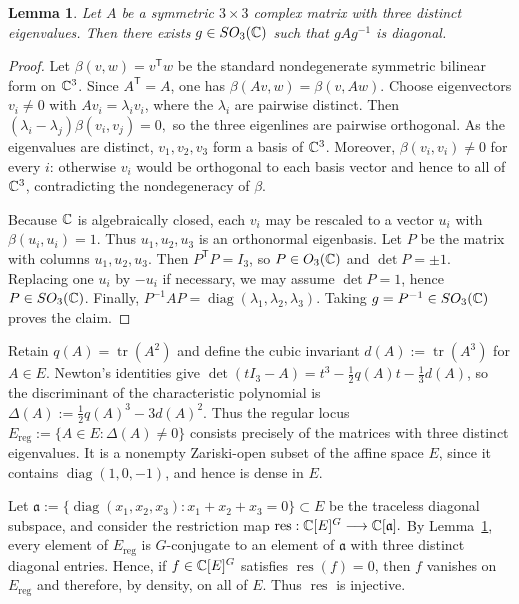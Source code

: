 \documentclass[10pt,a4paper]{amsart}
\numberwithin{equation}{section} \newtheorem{thm}{Theorem}[section] \newtheorem{lem}[thm]{Lemma} \newtheorem{ex}[thm]{Example} \newtheorem{prop}[thm]{Proposition} \newtheorem{cor}[thm]{Corollary} \newtheorem{defi}[thm]{Definition} \newtheorem{rmk}[thm]{Remark} \newtheorem{notation}[thm]{Notation}
\begin{document}
\begin{lem}\label{lem:complex-symmetric}
Let $A$ be a symmetric $3\times3$ complex matrix with three distinct eigenvalues. Then there exists $g\in SO_3(\mathbb{C})$ such that $gAg^{-1}$ is diagonal.
\end{lem}

\begin{proof}
Let $\beta(v,w)=v^{\mathsf T}w$ be the standard nondegenerate symmetric bilinear form on $\mathbb{C}^3$. Since $A^{\mathsf T}=A$, one has $\beta(Av,w)=\beta(v,Aw)$. Choose eigenvectors $v_i\ne0$ with $Av_i=\lambda_i v_i$, where the $\lambda_i$ are pairwise distinct. Then \((\lambda_i-\lambda_j)\beta(v_i,v_j)=0,\) so the three eigenlines are pairwise orthogonal. As the eigenvalues are distinct, $v_1,v_2,v_3$ form a basis of $\mathbb{C}^3$. Moreover, $\beta(v_i,v_i)\ne0$ for every $i$: otherwise $v_i$ would be orthogonal to each basis vector and hence to all of $\mathbb{C}^3$, contradicting the nondegeneracy of $\beta$.

Because $\mathbb{C}$ is algebraically closed, each $v_i$ may be rescaled to a vector $u_i$ with $\beta(u_i,u_i)=1$. Thus $u_1,u_2,u_3$ is an orthonormal eigenbasis. Let $P$ be the matrix with columns $u_1,u_2,u_3$. Then $P^{\mathsf T}P=I_3$, so $P\in O_3(\mathbb{C})$ and $\det P=\pm1$. Replacing one $u_i$ by $-u_i$ if necessary, we may assume $\det P=1$, hence $P\in SO_3(\mathbb{C})$. Finally, \(P^{-1}AP=\operatorname{diag}(\lambda_1,\lambda_2,\lambda_3).\) Taking $g=P^{-1}\in SO_3(\mathbb{C})$ proves the claim.
\end{proof}

Retain $q(A)=\operatorname{tr}(A^2)$ and define the cubic invariant \(d(A):=\operatorname{tr}(A^3)\) for $A\in E$. Newton's identities give \(\det(tI_3-A)=t^3-\frac12q(A)t-\frac13d(A)\), so the discriminant of the characteristic polynomial is \(\Delta(A):=\frac12q(A)^3-3d(A)^2.\) Thus the regular locus \(E_{\mathrm{reg}}:=\{A\in E:\Delta(A)\ne0\}\) consists precisely of the matrices with three distinct eigenvalues. It is a nonempty Zariski-open subset of the affine space $E$, since it contains $\operatorname{diag}(1,0,-1)$, and hence is dense in $E$.

Let \(\mathfrak a :=\{\operatorname{diag}(x_1,x_2,x_3):x_1+x_2+x_3=0\} \subset E\) be the traceless diagonal subspace, and consider the restriction map \(\operatorname{res}:\mathbb{C}[E]^G\longrightarrow\mathbb{C}[\mathfrak a].\) By Lemma~\ref{lem:complex-symmetric}, every element of $E_{\mathrm{reg}}$ is $G$-conjugate to an element of $\mathfrak a$ with three distinct diagonal entries. Hence, if $f\in\mathbb{C}[E]^G$ satisfies $\operatorname{res}(f)=0$, then $f$ vanishes on $E_{\mathrm{reg}}$ and therefore, by density, on all of $E$. Thus $\operatorname{res}$ is injective.
\end{document}
